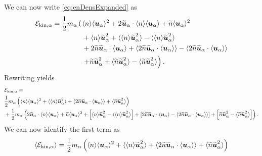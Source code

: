 We can now write \cref{eq:enDensExpanded} as
%
\begin{align*}
     \mathcal{E}_{\text{kin},\alpha} =
        \frac{1}{2}m_\alpha\left(\right.&
            \langle{n}\rangle \langle{\boldsymbol{u}_\alpha}\rangle^2
             + 2 \widetilde{ \boldsymbol{u}}_\alpha\cdot \langle{n}\rangle \langle{\boldsymbol{u}_\alpha}\rangle
             + \widetilde{ n} \langle{\boldsymbol{u}_\alpha}\rangle^2
             \\
             &
             + \langle{n}\rangle\widetilde{ \boldsymbol{u}}_\alpha^2
             + \langle{\langle{n}\rangle\widetilde{ \boldsymbol{u}}_\alpha^2}\rangle
             - \langle{\langle{n}\rangle\widetilde{ \boldsymbol{u}}_\alpha^2}\rangle
             \\
             &
             + 2 \widetilde{ n} \widetilde{ \boldsymbol{u}}_\alpha\cdot\langle{\boldsymbol{u}_\alpha}\rangle
             + \langle{2 \widetilde{ n} \widetilde{ \boldsymbol{u}}_\alpha\cdot\langle{\boldsymbol{u}_\alpha}\rangle}\rangle
             - \langle{2 \widetilde{ n} \widetilde{ \boldsymbol{u}}_\alpha\cdot\langle{\boldsymbol{u}_\alpha}\rangle}\rangle
             \\
             &\left.
             + \widetilde{ n}\widetilde{ \boldsymbol{u}}_\alpha^2
             + \langle{\widetilde{ n}\widetilde{ \boldsymbol{u}}_\alpha^2}\rangle
             - \langle{\widetilde{ n}\widetilde{ \boldsymbol{u}}_\alpha^2}\rangle
             \right).
\end{align*}
%
Rewriting yields
%
\begin{align*}
     &\mathcal{E}_{\text{kin},\alpha} =
     \\&
        \frac{1}{2}m_\alpha\left(
            \langle{n}\rangle \langle{\boldsymbol{u}_\alpha}\rangle^2
             + \langle{\langle{n}\rangle\widetilde{ \boldsymbol{u}}_\alpha^2}\rangle
             + \langle{2 \widetilde{ n} \widetilde{ \boldsymbol{u}}_\alpha\cdot\langle{\boldsymbol{u}_\alpha}\rangle}\rangle
             + \langle{\widetilde{ n}\widetilde{ \boldsymbol{u}}_\alpha^2}\rangle
        \right)
             \\
             &+
        \frac{1}{2}m_\alpha\left(
              2 \widetilde{ \boldsymbol{u}}_\alpha\cdot \langle{n}\rangle \langle{\boldsymbol{u}_\alpha}\rangle
             + \widetilde{ n} \langle{\boldsymbol{u}_\alpha}\rangle^2
             +
             \left[\langle{n}\rangle\widetilde{ \boldsymbol{u}}_\alpha^2
                - \langle{\langle{n}\rangle\widetilde{ \boldsymbol{u}}_\alpha^2}\rangle
             \right]
             +
             \left[2 \widetilde{ n} \widetilde{ \boldsymbol{u}}_\alpha\cdot\langle{\boldsymbol{u}_\alpha}\rangle
                - \langle{2 \widetilde{ n} \widetilde{ \boldsymbol{u}}_\alpha\cdot\langle{\boldsymbol{u}_\alpha}\rangle}\rangle
             \right]
             +
             \left[
               \widetilde{ n}\widetilde{ \boldsymbol{u}}_\alpha^2
             - \langle{\widetilde{ n}\widetilde{ \boldsymbol{u}}_\alpha^2}\rangle
             \right]
             \right).
\end{align*}
%
We can now identify the first term as
%
\begin{align}
     \expt{\mathcal{E}_{\text{kin},\a}} =
        \frac{1}{2}m_\a\L(
            \expt{n} \expt{\ve{u}_\a}^2
             + \expt{\expt{n}\wt{\ve{u}}_\a^2}
             + \expt{2 \wt{n} \wt{\ve{u}}_\a\cdot\expt{\ve{u}_\a}}
             + \expt{\wt{n}\wt{\ve{u}}_\a^2}
        \R)
    \label{eq:enDensAvg}
\end{align}
%
